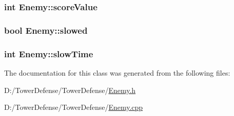 \hypertarget{class_enemy_abc49d5a2cef917c8ece8a16547f8efee}{
\subsubsection[{score\+Value}]{\setlength{\rightskip}{0pt plus 5cm}int Enemy\+::score\+Value\hspace{0.3cm}{\ttfamily [protected]}}}\label{class_enemy_abc49d5a2cef917c8ece8a16547f8efee}
\hypertarget{class_enemy_a7f185bcecfc927871387f6bda2191d0c}{
\subsubsection[{slowed}]{\setlength{\rightskip}{0pt plus 5cm}bool Enemy\+::slowed\hspace{0.3cm}{\ttfamily [protected]}}}\label{class_enemy_a7f185bcecfc927871387f6bda2191d0c}
\hypertarget{class_enemy_ad59184710c7f9df80138434b8487a9f5}{
\subsubsection[{slow\+Time}]{\setlength{\rightskip}{0pt plus 5cm}int Enemy\+::slow\+Time\hspace{0.3cm}{\ttfamily [protected]}}}\label{class_enemy_ad59184710c7f9df80138434b8487a9f5}


The documentation for this class was generated from the following files\+:\begin{DoxyCompactItemize}
\item 
D\+:/\+Tower\+Defense/\+Tower\+Defense/\hyperlink{_enemy_8h}{Enemy.\+h}\item 
D\+:/\+Tower\+Defense/\+Tower\+Defense/\hyperlink{_enemy_8cpp}{Enemy.\+cpp}\end{DoxyCompactItemize}
